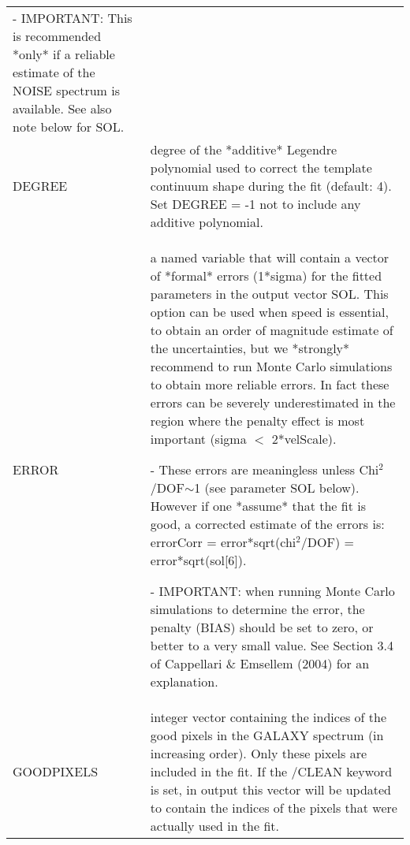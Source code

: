\begin{center}
\begin{longtable}{p{2.7cm}| p{11.1cm}}
     - IMPORTANT: This is recommended *only* if a reliable estimate of the
       NOISE spectrum is available. See also note below for SOL.\\
%
   DEGREE & degree of the *additive* Legendre polynomial used to correct
       the template continuum shape during the fit (default: 4).
       Set DEGREE = -1 not to include any additive polynomial.\\
%
   ERROR & a named variable that will contain a vector of *formal* errors
       (1*sigma) for the fitted parameters in the output vector SOL. This 
       option can be used when speed is essential, to obtain an order of 
       magnitude estimate of the uncertainties, but we *strongly* recommend to 
       run Monte Carlo simulations to obtain more reliable errors. In fact these 
       errors can be severely underestimated in the region where the penalty 
       effect is most important (sigma $<$ 2*velScale).

       \smallskip

     - These errors are meaningless unless Chi$^2$/DOF$\sim$1 (see
     parameter SOL below).  However if one *assume* that the fit is
     good, a corrected estimate of the errors is: errorCorr =
     error*sqrt(chi$^2$/DOF) = error*sqrt(sol[6]).

       \smallskip

     - IMPORTANT: when running Monte Carlo simulations to determine the error,
       the penalty (BIAS) should be set to zero, or better to a very small value.
       See Section 3.4 of Cappellari \& Emsellem (2004) for an explanation.\\
%
   GOODPIXELS & integer vector containing the indices of the good pixels in the
       GALAXY spectrum (in increasing order). Only these pixels are included in
       the fit. If the /CLEAN keyword is set, in output this vector will be updated
       to contain the indices of the pixels that were actually used in the fit.

      \smallskip


\end{longtable}
\end{center}

